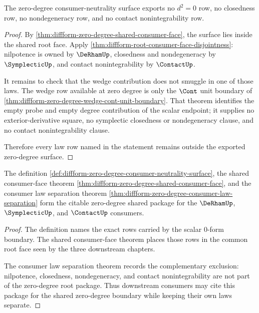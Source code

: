 \begin{theorem}
\label{thm:diffform-zero-degree-consumer-law-separation}
The zero-degree consumer-neutrality surface exports no $d^2=0$ row, no
closedness row, no nondegeneracy row, and no contact nonintegrability row.
\end{theorem}
\begin{proof}
By \autoref{thm:diffform-zero-degree-shared-consumer-face}, the surface lies
inside the shared root face. Apply
\autoref{thm:diffform-root-consumer-face-disjointness}: nilpotence is owned by
$\DeRhamUp$, closedness and nondegeneracy by $\SymplecticUp$, and contact
nonintegrability by $\ContactUp$.

It remains to check that the wedge contribution does not smuggle in one of
those laws. The wedge row available at zero degree is only the $\Cont$ unit
boundary of
\autoref{thm:diffform-zero-degree-wedge-cont-unit-boundary}. That theorem
identifies the empty probe and empty degree contribution of the scalar
endpoint; it supplies no exterior-derivative square, no symplectic closedness
or nondegeneracy clause, and no contact nonintegrability clause.

Therefore every law row named in the statement remains outside the exported
zero-degree surface.
\end{proof}

\begin{theorem}
\label{thm:diffform-zero-degree-deps-ready-consumer-seal}
The definition
\autoref{def:diffform-zero-degree-consumer-neutrality-surface}, the shared
consumer-face theorem
\autoref{thm:diffform-zero-degree-shared-consumer-face}, and the consumer law
separation theorem
\autoref{thm:diffform-zero-degree-consumer-law-separation} form the citable
zero-degree shared package for the $\DeRhamUp$, $\SymplecticUp$, and
$\ContactUp$ consumers.
\end{theorem}
\begin{proof}
The definition names the exact rows carried by the scalar $0$-form boundary.
The shared consumer-face theorem places those rows in the common root face
seen by the three downstream chapters.

The consumer law separation theorem records the complementary exclusion:
nilpotence, closedness, nondegeneracy, and contact nonintegrability are not
part of the zero-degree root package. Thus downstream consumers may cite this
package for the shared zero-degree boundary while keeping their own laws
separate.
\end{proof}
